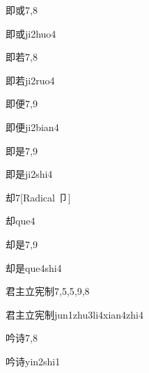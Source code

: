 \begin{entry}{即或}{7,8}
  \begin{phonetics}{即或}{ji2huo4}
  \end{phonetics}
\end{entry}

\begin{entry}{即若}{7,8}
  \begin{phonetics}{即若}{ji2ruo4}
  \end{phonetics}
\end{entry}

\begin{entry}{即便}{7,9}
  \begin{phonetics}{即便}{ji2bian4}
  \end{phonetics}
\end{entry}

\begin{entry}{即是}{7,9}
  \begin{phonetics}{即是}{ji2shi4}
  \end{phonetics}
\end{entry}

\begin{entry}{却}{7}[Radical 卩]
  \begin{phonetics}{却}{que4}
  \end{phonetics}
\end{entry}

\begin{entry}{却是}{7,9}
  \begin{phonetics}{却是}{que4shi4}
  \end{phonetics}
\end{entry}

\begin{entry}{君主立宪制}{7,5,5,9,8}
  \begin{phonetics}{君主立宪制}{jun1zhu3li4xian4zhi4}
  \end{phonetics}
\end{entry}

\begin{entry}{吟诗}{7,8}
  \begin{phonetics}{吟诗}{yin2shi1}
  \end{phonetics}
\end{entry}

